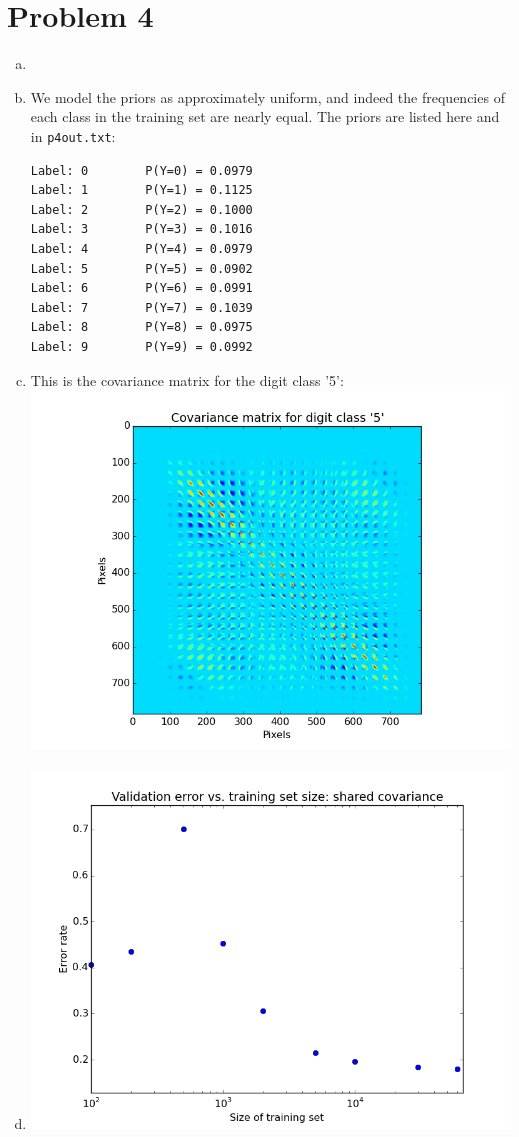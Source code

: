 \documentclass[11pt]{article}
\begin{document}
\section*{Problem 4}
\begin{enumerate}[a)]
\item 
\item We model the priors as approximately uniform, and indeed the frequencies of each class in the training set are nearly equal. The priors are listed here and in \texttt{p4out.txt}:
\begin{verbatim}
Label: 0        P(Y=0) = 0.0979
Label: 1        P(Y=1) = 0.1125
Label: 2        P(Y=2) = 0.1000
Label: 3        P(Y=3) = 0.1016
Label: 4        P(Y=4) = 0.0979
Label: 5        P(Y=5) = 0.0902
Label: 6        P(Y=6) = 0.0991
Label: 7        P(Y=7) = 0.1039
Label: 8        P(Y=8) = 0.0975
Label: 9        P(Y=9) = 0.0992
\end{verbatim}
\item This is the covariance matrix for the digit class '5':\\
\includegraphics[scale=0.6]{images/p4c}
\newpage
\item 
\includegraphics[scale=0.45]{images/p4d1}

\end{enumerate}
\end{document}

